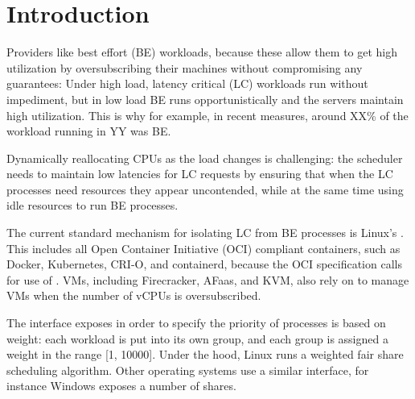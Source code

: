 \section{Introduction}
\label{s:intro}

Providers like best effort (BE) workloads, because these allow them to get high
utilization by oversubscribing their machines without compromising any
guarantees: Under high load, latency critical (LC) workloads run without
impediment, but in low load BE runs opportunistically and the servers maintain
high utilization.
This is why for example, in recent measures, around XX\% of the workload running
in YY was BE.

Dynamically reallocating CPUs as the load changes is challenging: the scheduler
needs to maintain low latencies for LC requests by ensuring that when the LC
processes need resources they appear uncontended, while at the same time using
idle resources to run BE processes.

The current standard mechanism for isolating LC from BE processes is Linux's
\cgroups{}. This includes all Open Container Initiative (OCI) compliant
containers, such as Docker, Kubernetes, CRI-O, and containerd, because the OCI
specification calls for use of \cgroups{}. VMs, including Firecracker, AFaas,
and KVM, also rely on \cgroups{} to manage VMs when the number of vCPUs is
oversubscribed.

The interface \cgroups{} exposes in order to specify the priority of processes
is based on weight: each workload is put into its own group, and each group is
assigned a weight in the range [1, 10000]. Under the hood, Linux runs a weighted
fair share scheduling algorithm. Other operating systems use a similar
interface, for instance Windows exposes a number of shares. 

